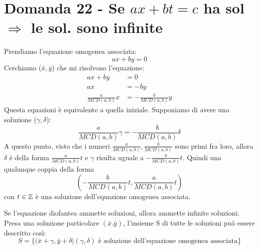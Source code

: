 \documentclass[]{article}
\begin{document}
\section{Domanda 22 - Se $ax+bt=c$ ha sol $\Rightarrow$ le sol. sono infinite}
Prendiamo l'equazione omogenea associata: $$ax+by=0$$ Cerchiamo ($\bar{x},\bar{y}$) che mi risolvono l'equazione: 
\begin{align}
ax + by &=0\\
ax &= -by\\
\frac{a}{MCD(a,b)} x &= -\frac{b}{MCD(a,b)}y
\end{align}
Questa equazioni è equivalente a quella iniziale. Supponiamo di avere una soluzione ($\gamma, \delta$): $$\frac{a}{MCD(a,b)}\gamma=-\frac{b}{MCD(a,b)}\delta$$ A questo punto, visto che i numeri $\frac{a}{MCD(a,b)}, \frac{b}{MCD(a,b)}$ sono primi fra loro, allora $\delta$ è della forma $\frac{a}{MCD(a,b)}t$ e $\gamma$ risulta uguale a $-\frac{b}{MCD(a,b)}t$. Quindi una qualunque coppia della forma $$\left(-\frac{b}{MCD(a,b)}t, \frac{a}{MCD(a,b)}t\right)$$ con $t \in \mathbb{Z}$ è una soluzione dell'equazione omogenea associata. 
\begin{lem} Se l'equazione diofantea ammette soluzioni, allora ammette infinite soluzioni. Presa una soluzione particolare $(\bar{x}. \bar{y})$, l'insieme S di tutte le soluzioni può essere descritto così:
$$S = \{(\bar{x}+\gamma, \bar{y} + \delta | (\gamma, \delta) \text{ è soluzione dell'equazione omogenea associata} \}$$
\end{lem}
\end{document}
